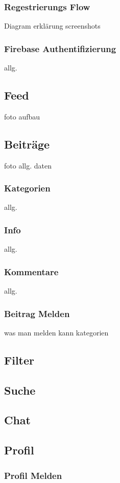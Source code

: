 \subsubsection{Regestrierungs Flow}
Diagram
erklärung 
screenshots


\subsubsection{Firebase Authentifizierung}
allg.


\subsection{Feed}
foto
aufbau
\subsection{Beiträge}
foto
allg.
daten
\subsubsection{Kategorien}
allg.


\subsubsection{Info}
allg.
\subsubsection{Kommentare}
allg.
\subsubsection{Beitrag Melden}
was  man melden kann 
kategorien


\subsection{Filter}
\subsection{Suche}
\subsection{Chat}
\subsection{Profil}
\subsubsection{Profil Melden}

